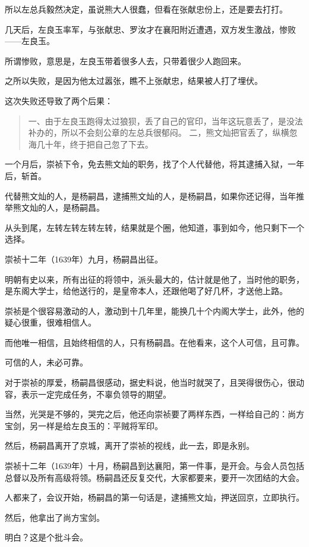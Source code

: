 \begin{multicols}{\theparacolNo}
		所以左总兵毅然决定，虽说熊大人很蠢，但看在张献忠份上，还是要去打打。

		几天后，左良玉率军，与张献忠、罗汝才在襄阳附近遭遇，双方发生激战，惨败——左良玉。

		所谓惨败，意思是，左良玉带着很多人去，只带着很少人跑回来。

		之所以失败，是因为他太过嚣张，瞧不上张献忠，结果被人打了埋伏。

		这次失败还导致了两个后果：
		{\footnotesize \begin{quote}
			一、由于左良玉跑得太过狼狈，丢了自己的官印，当年这玩意丢了，是没法补办的，所以不会刻公章的左总兵很郁闷。
			二，熊文灿把官丢了，纵横忽海几十年，终于把自己忽了下去。
		\end{quote}}

		一个月后，崇祯下令，免去熊文灿的职务，找了个人代替他，将其逮捕入狱，一年后，斩首。

		代替熊文灿的人，是杨嗣昌，逮捕熊文灿的人，是杨嗣昌，如果你还记得，当年推举熊文灿的人，是杨嗣昌。

		从头到尾，左转左转左转左转，结果就是个圈，他知道，事到如今，他只剩下一个选择。

		崇祯十二年（1639年）九月，杨嗣昌出征。

		明朝有史以来，所有出征的将领中，派头最大的，估计就是他了，当时他的职务，是东阁大学士，给他送行的，是皇帝本人，还跟他喝了好几杯，才送他上路。

		崇祯是个很容易激动的人，激动到十几年里，能换几十个内阁大学士，此外，他的疑心很重，很难相信人。

		而他唯一相信，且始终相信的人，只有杨嗣昌。在他看来，这个人可信，且可靠。

		可信的人，未必可靠。

		对于崇祯的厚爱，杨嗣昌很感动，据史料说，他当时就哭了，且哭得很伤心，很动容，表示一定完成任务，不辜负领导的期望。

		当然，光哭是不够的，哭完之后，他还向崇祯要了两样东西，一样给自己的：尚方宝剑，另一样是给左良玉的：平贼将军印。

		然后，杨嗣昌离开了京城，离开了崇祯的视线，此一去，即是永别。

		崇祯十二年（1639年）十月，杨嗣昌到达襄阳，第一件事，是开会。与会人员包括总督以及所有高级将领。杨嗣昌还反复交代，大家都要来，要开一次团结的大会。

		人都来了，会议开始，杨嗣昌的第一句话是，逮捕熊文灿，押送回京，立即执行。

		然后，他拿出了尚方宝剑。

		明白？这是个批斗会。


\end{multicols}
